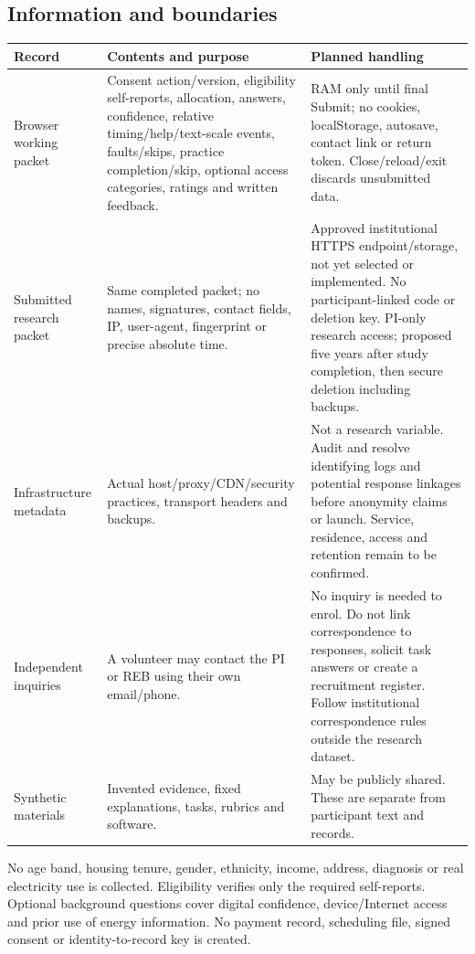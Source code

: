 \documentclass[11pt,letterpaper]{article}
\begin{document}
\subsection{Information and boundaries}
\begin{longtable}{L{3.0cm}L{5.7cm}L{5.8cm}}
\toprule
Record & Contents and purpose & Planned handling\\
\midrule
\endhead
Browser working packet & Consent action/version, eligibility self-reports, allocation, answers, confidence, relative timing/help/text-scale events, faults/skips, practice completion/skip, optional access categories, ratings and written feedback. & RAM only until final Submit; no cookies, localStorage, autosave, contact link or return token. Close/reload/exit discards unsubmitted data.\\
Submitted research packet & Same completed packet; no names, signatures, contact fields, IP, user-agent, fingerprint or precise absolute time. & Approved institutional HTTPS endpoint/storage, not yet selected or implemented. No participant-linked code or deletion key. PI-only research access; proposed five years after study completion, then secure deletion including backups.\\
Infrastructure metadata & Actual host/proxy/CDN/security practices, transport headers and backups. & Not a research variable. Audit and resolve identifying logs and potential response linkages before anonymity claims or launch. Service, residence, access and retention remain to be confirmed.\\
Independent inquiries & A volunteer may contact the PI or REB using their own email/phone. & No inquiry is needed to enrol. Do not link correspondence to responses, solicit task answers or create a recruitment register. Follow institutional correspondence rules outside the research dataset.\\
Synthetic materials & Invented evidence, fixed explanations, tasks, rubrics and software. & May be publicly shared. These are separate from participant text and records.\\
\bottomrule
\end{longtable}
No age band, housing tenure, gender, ethnicity, income, address, diagnosis or real electricity use is collected. Eligibility verifies only the required self-reports. Optional background questions cover digital confidence, device/Internet access and prior use of energy information. No payment record, scheduling file, signed consent or identity-to-record key is created.
\end{document}
